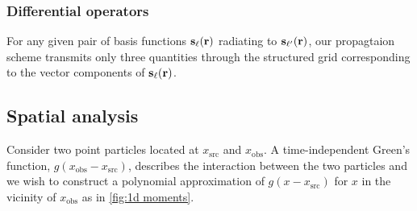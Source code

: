 \subsubsection{Differential operators}

For any given pair of basis functions $\vb{s}_\ell(\vb{r})$ radiating to $\vb{s}_{\ell'}(\vb{r})$, our propagtaion scheme transmits only three quantities  through the structured grid corresponding to the vector components of $\vb{s}_\ell(\vb{r})$.


\subsection{Spatial analysis}

Consider two point particles located at $x_\text{src}$ and $x_\text{obs}$.
A time-independent Green's function, $g(x_\text{obs} - x_\text{src})$, describes the interaction between the two particles and we wish to construct a polynomial approximation of $g(x - x_\text{src})$ for $x$ in the vicinity of $x_\text{obs}$ as in \cref{fig:1d moments}.

